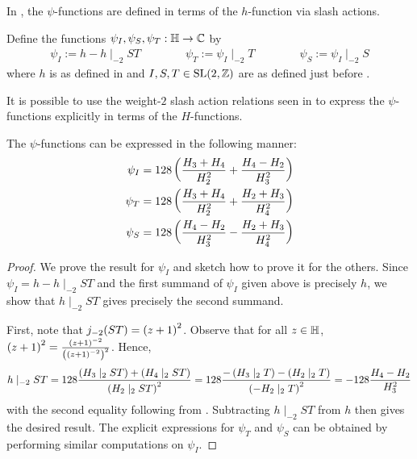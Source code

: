 In \cite{Viazovska8}, the $\psi$-functions are defined in terms of the $h$-function via slash actions.

\begin{boxdefinition}\label{Ch4:Def:psis_in_terms_of_h}
    Define the functions $\psi_I, \psi_S, \psi_T : \mathbb{H} \to \mathbb{C}$ by
    \begin{align*}
        \psi_I := h - h\mid_{-2} ST
        \qquad\qquad
        \psi_T := \psi_I \mid_{-2} T
        \qquad\qquad
        \psi_S := \psi_I \mid_{-2} S
    \end{align*}
    where $h$ is as defined in  and $I, S, T \in \operatorname{SL}\!\left( 2, \mathbb{Z} \right)$ are as defined just before .
\end{boxdefinition}

It is possible to use the weight-$2$ slash action relations seen in  to express the $\psi$-functions explicitly in terms of the $H$-functions.

\begin{boxlemma}\label{Ch4:Lemma:psi_explicitly}
    The $\psi$-functions can be expressed in the following manner:
    \begin{align*}
        \psi_I &= 128 \left( \frac{H_3 + H_4}{H_2^2} + \frac{H_4 - H_2}{H_3^2} \right) \\
        \psi_T &= 128 \left( \frac{H_3 + H_4}{H_2^2} + \frac{H_2 + H_3}{H_4^2} \right) \\
        \psi_S &= 128 \left( \frac{H_4 - H_2}{H_3^2} - \frac{H_2 + H_3}{H_4^2} \right)
    \end{align*}
\end{boxlemma}
\begin{proof}
    We prove the result for $\psi_I$ and sketch how to prove it for the others. Since $\psi_I = h - h \mid_{-2} ST$ and the first summand of $\psi_I$ given above is precisely $h$, we show that $h \mid_{-2} ST$ gives precisely the second summand.

    First, note that $j_{-2}\!\left( ST \right) = \left( z + 1 \right)^2$. Observe that for all $z \in \mathbb{H}$, $\left( z + 1 \right)^2 = \frac{\left( z + 1 \right)^{-2}}{\left( \left( z + 1 \right)^{-2} \right)^2}$. Hence,
    \begin{align*}
        h \mid_{-2} ST
        = 128 \frac{\left( H_3 \mid_2 ST \right) + \left( H_4 \mid_2 ST \right)}{\left( H_2 \mid_2 ST \right)^2}
        = 128 \frac{-\left( H_3 \mid_2 T \right) - \left( H_2 \mid_2 T \right)}{\left( -H_2 \mid_2 T \right)^2}
        = -128 \frac{H_4 - H_2}{H_3^2}
    \end{align*}
    with the second equality following from . Subtracting $h \mid_{-2} ST$ from $h$ then gives the desired result. The explicit expressions for $\psi_T$ and $\psi_S$ can be obtained by performing similar computations on $\psi_I$.
\end{proof}

